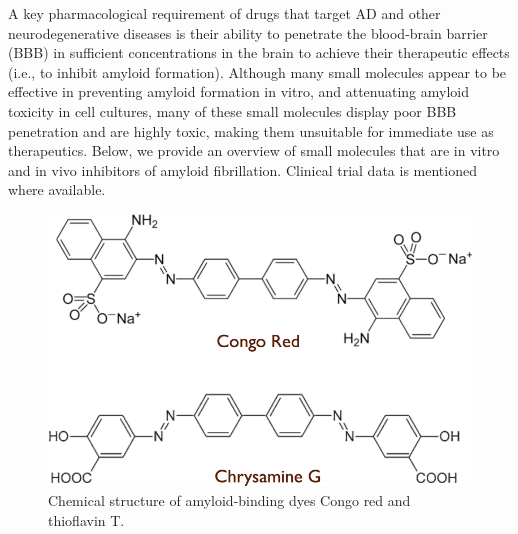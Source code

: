 A key pharmacological requirement of drugs that target AD and other neurodegenerative diseases is their ability to penetrate the blood-brain barrier (BBB) in sufficient concentrations in the brain to achieve their therapeutic effects (i.e., to inhibit amyloid formation).\cite{Hawkes:2009gu,Hubbard:2011fs} Although many small molecules appear to be effective in preventing amyloid formation in vitro, and attenuating amyloid toxicity in cell cultures, many of these small molecules display poor BBB penetration and are highly toxic, making them unsuitable for immediate use as therapeutics.
Below, we provide an overview of small molecules that are in vitro and in vivo inhibitors of amyloid fibrillation.  Clinical trial data is mentioned where available.

\begin{figure}
\centering
\includegraphics[width=4.5in]{figures/introduction/dyes.pdf}
\caption[Amyloid-binding dyes]{Chemical structure of amyloid-binding dyes Congo red and thioflavin T.}
\label{fig:amyloid_dyes}
\end{figure}


